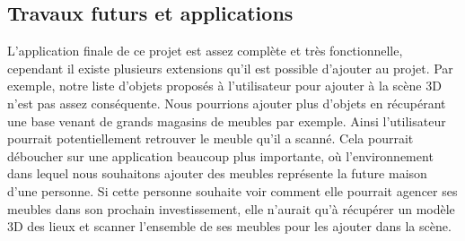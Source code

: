 \subsection{Travaux futurs et applications}
L'application finale de ce projet est assez complète et très fonctionnelle, cependant il existe plusieurs extensions qu'il 
est possible d'ajouter au projet. Par exemple, notre liste d'objets proposés à l'utilisateur pour ajouter à la 
scène 3D n'est pas assez conséquente. Nous pourrions ajouter plus d'objets en récupérant une base venant de grands magasins
de meubles par exemple. Ainsi l'utilisateur pourrait potentiellement retrouver le meuble qu'il a scanné. Cela pourrait
déboucher sur une application beaucoup plus importante, où l'environnement dans lequel nous souhaitons ajouter des meubles
représente la future maison d'une personne. Si cette personne souhaite voir comment elle pourrait agencer ses meubles dans 
son prochain investissement, elle n'aurait qu'à récupérer un modèle 3D des lieux et scanner l'ensemble de ses meubles pour
les ajouter dans la scène.
